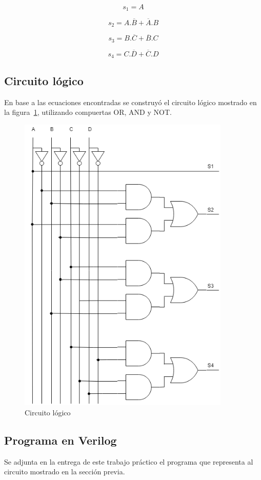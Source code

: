 \begin{equation}\label{s1_Karnaugh}
    s_{1}= A
\end{equation}

\begin{equation}\label{s2_Karnaugh}
    s_{2}= A.\overline{B}+\overline{A}.B
\end{equation}

\begin{equation}\label{s3_Karnaugh}
    s_{3}= B.\overline{C}+\overline{B}.C
\end{equation}

\begin{equation}\label{s4_Karnaugh}
    s_{4}= C.\overline{D}+\overline{C}.D
\end{equation}

\subsection{Circuito l\'ogico}\label{ej2_circ}

En base a las ecuaciones encontradas se construy\'o el circuito l\'ogico mostrado en la figura~\ref{fig:ej4_circuito_logico}, utilizando compuertas \textsc{OR}, \textsc{AND} y \textsc{NOT}.

\begin{figure}[H]
    \centering
    \includegraphics[width=0.9\textwidth]{./EJ_4/EJ4_TP1_Electro3.png}
    \caption{Circuito l\'ogico}
    \label{fig:ej4_circuito_logico}
\end{figure}

\subsection{Programa en Verilog}
Se adjunta en la entrega de este trabajo pr\'actico el programa que representa al circuito mostrado en la secci\'on previa.
